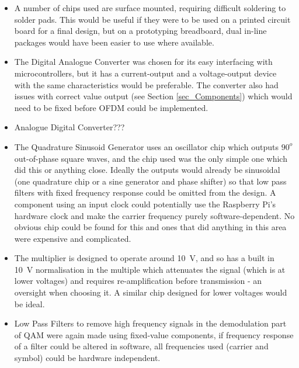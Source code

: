 \documentclass[../main.tex]{subfiles}
\begin{document}
\begin{itemize}
	\item A number of chips used are surface mounted, requiring difficult soldering to solder pads. This would be useful if they were to be used on a printed circuit board for a final design, but on a prototyping breadboard, dual in-line packages would have been easier to use where available.
	\item The Digital Analogue Converter was chosen for its easy interfacing with microcontrollers, but it has a current-output and a voltage-output device with the same characteristics would be preferable. The converter also had issues with correct value output (see Section \ref{sec_Components}) which would need to be fixed before OFDM could be implemented.
	\item Analogue Digital Converter???
	\item The Quadrature Sinusoid Generator uses an oscillator chip which outputs $90^o$ out-of-phase square waves, and the chip used was the only simple one which did this or anything close. Ideally the outputs would already be sinusoidal (one quadrature chip or a sine generator and phase shifter) so that low pass filters with fixed frequency response could be omitted from the design. A component using an input clock could potentially use the Raspberry Pi's hardware clock and make the carrier frequency purely software-dependent. No obvious chip could be found for this and ones that did anything in this area were expensive and complicated.
	\item The multiplier is designed to operate around \SI{10}{\volt}, and so has a built in \SI{10}{\volt} normalisation in the multiple which attenuates the signal (which is at lower voltages) and requires re-amplification before transmission - an oversight when choosing it. A similar chip designed for lower voltages would be ideal.
	\item Low Pass Filters to remove high frequency signals in the demodulation part of QAM were again made using fixed-value components, if frequency response of a filter could be altered in software, all frequencies used (carrier and symbol) could be hardware independent.
\end{itemize}
\end{document}
